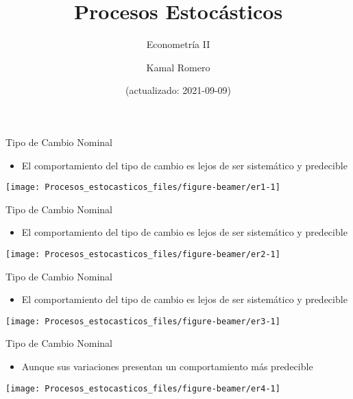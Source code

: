 \documentclass[ignorenonframetext,]{beamer}
\title{Procesos Estocásticos}
\subtitle{Econometría II}
\author{Kamal Romero}
\date{(actualizado: 2021-09-09)}
\providecommand{\tightlist}{%
  \setlength{\itemsep}{0pt}\setlength{\parskip}{0pt}}
\begin{document}
\frame{\titlepage}

\begin{frame}{Tipo de Cambio Nominal}

\begin{itemize}
\tightlist
\item
  El comportamiento del tipo de cambio es lejos de ser sistemático y
  predecible
\end{itemize}

\begin{center}\texttt{[image: Procesos\_estocasticos\_files/figure-beamer/er1-1]} \end{center}

\end{frame}

\begin{frame}{Tipo de Cambio Nominal}

\begin{itemize}
\tightlist
\item
  El comportamiento del tipo de cambio es lejos de ser sistemático y
  predecible
\end{itemize}

\begin{center}\texttt{[image: Procesos\_estocasticos\_files/figure-beamer/er2-1]} \end{center}

\end{frame}

\begin{frame}{Tipo de Cambio Nominal}

\begin{itemize}
\tightlist
\item
  El comportamiento del tipo de cambio es lejos de ser sistemático y
  predecible
\end{itemize}

\begin{center}\texttt{[image: Procesos\_estocasticos\_files/figure-beamer/er3-1]} \end{center}

\end{frame}

\begin{frame}{Tipo de Cambio Nominal}

\begin{itemize}
\tightlist
\item
  Aunque sus variaciones presentan un comportamiento más predecible
\end{itemize}

\begin{center}\texttt{[image: Procesos\_estocasticos\_files/figure-beamer/er4-1]} \end{center}

\end{frame}
\end{document}

